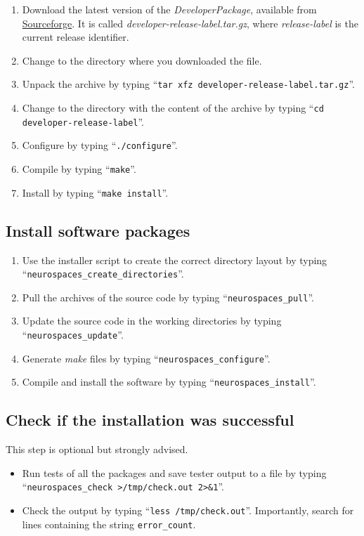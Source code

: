 \documentclass[12pt]{article}
\begin{document}
\begin{enumerate}
   \item Download the latest version of the {\it DeveloperPackage}, available from \href{http://sourceforge.net/projects/neurospaces/files/}{Sourceforge}. It is called {\it developer-release-label.tar.gz}, where {\it release-label} is the current release identifier.
   \item Change to the directory where you downloaded the file.
   \item Unpack the archive by typing ``{\tt tar xfz developer-release-label.tar.gz}''.
   \item Change to the directory with the content of the archive by typing ``{\tt cd developer-release-label}''.
   \item Configure by typing ``{\tt ./configure}''.
   \item Compile by typing ``{\tt make}''.
   \item Install by typing ``{\tt make install}''. 
\end{enumerate}

\subsection*{Install software packages}

\begin{enumerate}
   \item Use the installer script to create the correct directory layout by typing ``{\tt neurospaces\_create\_directories}''.
   \item Pull the archives of the source code by typing ``{\tt neurospaces\_pull}''.
   \item Update the source code in the working directories by typing ``{\tt neurospaces\_update}''.
   \item Generate {\it make} files by typing ``{\tt neurospaces\_configure}''.
   \item Compile and install the software by typing ``{\tt neurospaces\_install}''.
\end{enumerate}

\subsection*{Check if the installation was successful}

This step is optional but strongly advised.

\begin{itemize}      
   \item[] Run tests of all the packages and save tester output to a file  by typing ``{\tt neurospaces\_check >/tmp/check.out 2>\&1}''.
   \item[] Check the output by typing ``{\tt less /tmp/check.out}''. Importantly, search for lines containing the string {\tt error\_count}.
\end{itemize}
    
\end{document}
